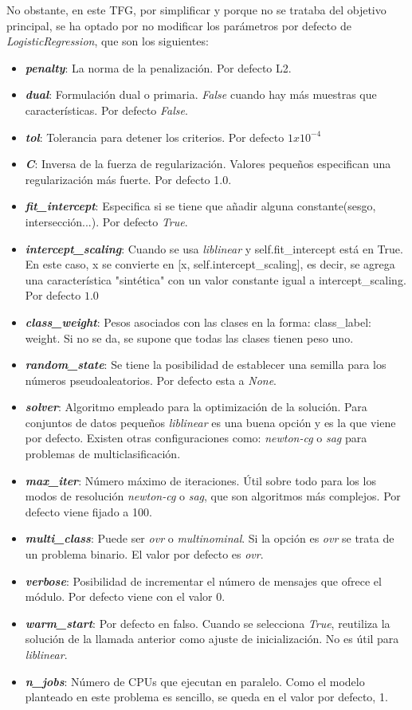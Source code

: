 No obstante, en este TFG, por simplificar y porque no se trataba del objetivo principal, se ha optado por no modificar los parámetros por defecto de \textit{LogisticRegression}, que son los siguientes:
\begin{itemize}
\item \textit{\textbf{penalty}}: La norma de la penalización. Por defecto L2.
\item \textit{\textbf{dual}}: Formulación dual o  primaria. \textit{False} cuando hay más muestras que características. Por defecto \textit{False}. 
\item \textit{\textbf{tol}}: Tolerancia para detener los criterios. Por defecto $1 x 10^{-4}$ 
\item \textit{\textbf{C}}: Inversa de la fuerza de regularización. Valores pequeños especifican una regularización más fuerte. Por defecto 1.0.
\item \textit{\textbf{fit\_intercept}}: Especifica si se tiene que añadir alguna constante(sesgo, intersección...). Por defecto \textit{True}.
\item \textit{\textbf{intercept\_scaling}}: Cuando se usa \textit{liblinear} y self.fit\_intercept está en True. En este caso, x se convierte en [x, self.intercept\_scaling], es decir, se agrega una característica "sintética" con un valor constante igual a intercept\_scaling. Por defecto $1.0$
\item \textit{\textbf{class\_weight}}: Pesos asociados con las clases en la forma: {class\_label: weight}. Si no se da, se supone que todas las clases tienen peso uno.
\item \textit{\textbf{random\_state}}: Se tiene la posibilidad de establecer una semilla para los números pseudoaleatorios. Por defecto esta a \textit{None}.
\item \textit{\textbf{solver}}: Algoritmo empleado para la optimización de la solución. Para conjuntos de datos pequeños \textit{liblinear} es una buena opción y es la que viene por defecto. Existen otras configuraciones como: \textit{newton-cg} o \textit{sag} para problemas de multiclasificación. 
\item \textit{\textbf{max\_iter}}: Número máximo de iteraciones. Útil sobre todo para los los modos de resolución \textit{newton-cg} o \textit{sag}, que son algoritmos más complejos. Por defecto viene fijado a 100.
\item \textit{\textbf{multi\_class}}: Puede ser \textit{ovr} o \textit{multinominal}. Si la opción es \textit{ovr} se trata de un problema binario. El valor por defecto es \textit{ovr}.
\item \textit{\textbf{verbose}}: Posibilidad de incrementar el número de mensajes que ofrece el módulo. Por defecto viene con el valor 0.
\item \textit{\textbf{warm\_start}}: Por defecto en falso. Cuando se selecciona \textit{True}, reutiliza la solución de la llamada anterior como ajuste de inicialización. No es útil para \textit{liblinear}.
\item \textit{\textbf{n\_jobs}}: Número de CPUs que ejecutan en paralelo. Como el modelo planteado en este problema es sencillo, se queda en el valor por defecto, 1.
\end{itemize}

